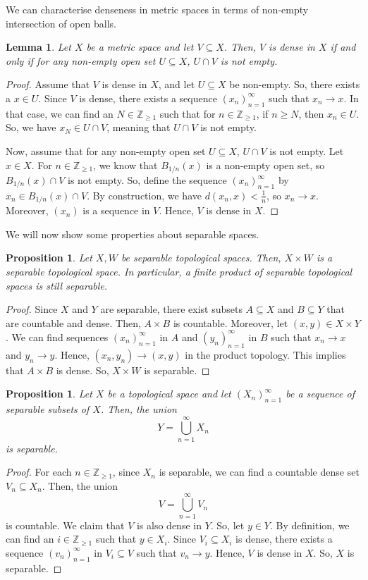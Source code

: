 \documentclass[a4paper, openany]{memoir}
\theoremstyle{definition}
\theoremstyle{plain}
\newtheorem{lemma}[definition]{Lemma}
\newtheorem{proposition}[definition]{Proposition}
\begin{document}
    We can characterise denseness in metric spaces in terms of non-empty intersection of open balls.
    \begin{lemma}
        Let $X$ be a metric space and let $V \subseteq X$. Then, $V$ is dense in $X$ if and only if for any non-empty open set $U \subseteq X$, $U \cap V$ is not empty.
    \end{lemma}
    \begin{proof}
        Assume that $V$ is dense in $X$, and let $U \subseteq X$ be non-empty. So, there exists a $x \in U$. Since $V$ is dense, there exists a sequence $(x_n)_{n=1}^\infty$ such that $x_n \to x$. In that case, we can find an $N \in \mathbb{Z}_{\geq 1}$ such that for $n \in \mathbb{Z}_{\geq 1}$, if $n \geq N$, then $x_n \in U$. So, we have $x_N \in U \cap V$, meaning that $U \cap V$ is not empty.

        Now, assume that for any non-empty open set $U \subseteq X$, $U \cap V$ is not empty. Let $x \in X$. For $n \in \mathbb{Z}_{\geq 1}$, we know that $B_{1/n}(x)$ is a non-empty open set, so $B_{1/n}(x) \cap V$ is not empty. So, define the sequence $(x_n)_{n=1}^\infty$ by $x_n \in B_{1/n}(x) \cap V$. By construction, we have $d(x_n, x) < \frac{1}{n}$, so $x_n \to x$. Moreover, $(x_n)$ is a sequence in $V$. Hence, $V$ is dense in $X$.
    \end{proof}

    We will now show some properties about separable spaces.
    \begin{proposition}
        Let $X, W$ be separable topological spaces. Then, $X \times W$ is a separable topological space. In particular, a finite product of separable topological spaces is still separable.
    \end{proposition}
    \begin{proof}
        Since $X$ and $Y$ are separable, there exist subsets $A \subseteq X$ and $B \subseteq Y$ that are countable and dense. Then, $A \times B$ is countable. Moreover, let $(x, y) \in X \times Y$. We can find sequences $(x_n)_{n=1}^\infty$ in $A$ and $(y_n)_{n=1}^\infty$ in $B$ such that $x_n \to x$ and $y_n \to y$. Hence, $(x_n, y_n) \to (x, y)$ in the product topology. This implies that $A \times B$ is dense. So, $X \times W$ is separable.
    \end{proof}

    \begin{proposition}
        Let $X$ be a topological space and let $(X_n)_{n=1}^\infty$ be a sequence of separable subsets of $X$. Then, the union
        \[Y = \bigcup_{n=1}^\infty X_n\]
        is separable.
    \end{proposition}
    \begin{proof}
        For each $n \in \mathbb{Z}_{\geq 1}$, since $X_n$ is separable, we can find a countable dense set $V_n \subseteq X_n$. Then, the union
        \[V = \bigcup_{n=1}^\infty V_n\]
        is countable. We claim that $V$ is also dense in $Y$. So, let $y \in Y$. By definition, we can find an $i \in \mathbb{Z}_{\geq 1}$ such that $y \in X_i$. Since $V_i \subseteq X_i$ is dense, there exists a sequence $(v_n)_{n=1}^\infty$ in $V_i \subseteq V$ such that $v_n \to y$. Hence, $V$ is dense in $X$. So, $X$ is separable.
    \end{proof}
\end{document}
